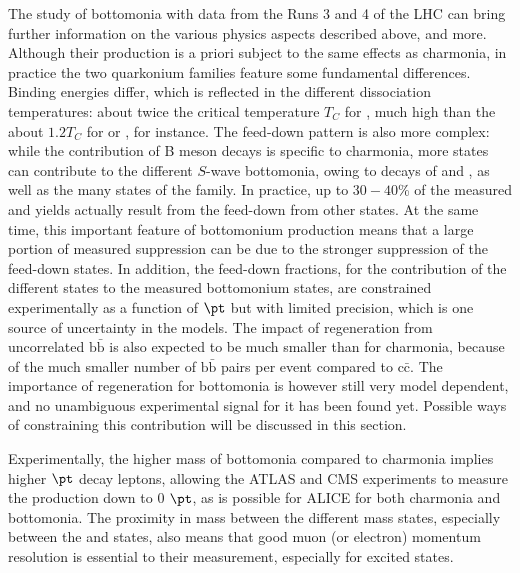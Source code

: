 \documentclass[../report.tex]{subfiles}
\begin{document}
The study of bottomonia with \PbPb data from the Runs 3 and 4 of the LHC can bring further information on the various physics aspects described above, and more.
Although their production is a priori subject to the same effects as charmonia, in practice the two quarkonium families feature some fundamental differences.
Binding energies differ, which is reflected in the different dissociation temperatures: about twice the critical temperature $T_C$ for , much high than the about
$1.2 T_C$ for \PJgy or , for instance. The feed-down pattern is also more complex: while the contribution of B meson decays is specific to charmonia, more states can
contribute to the different $S$-wave bottomonia, owing to decays of  and , as well as the many states of the \PGcb family. In practice, up to $30-40$\% of the measured 
 and  yields actually result from the feed-down from other states. At the same time, this important feature of bottomonium production means that
a large portion of measured  suppression can be due to the stronger suppression of the feed-down states.
In addition, the feed-down fractions, for the contribution of the 
different states to the measured bottomonium states, are constrained experimentally as a function of $\pt$ but with limited precision, which is one source of uncertainty in the models.
The impact of regeneration from uncorrelated $\text{b}\bar{\text{b}}$ is also expected to be much smaller than for charmonia, because of the much smaller number of $\text{b}\bar{\text{b}}$
pairs per \PbPb event compared to $\text{c}\bar{\text{c}}$. The importance of regeneration for bottomonia is however still very model dependent, and no unambiguous experimental signal
for it has been found yet. Possible ways of constraining this contribution will be discussed in this section.

Experimentally, the higher mass of bottomonia compared to charmonia implies higher $\pt$ decay leptons, allowing the ATLAS and CMS experiments to measure the production down to 0 $\pt$,
as is possible for ALICE for both charmonia and bottomonia. The proximity in mass between the different mass states, especially between the  and  states, also 
means that good muon (or electron) momentum resolution is essential to their measurement, especially for excited states. 
\end{document}
